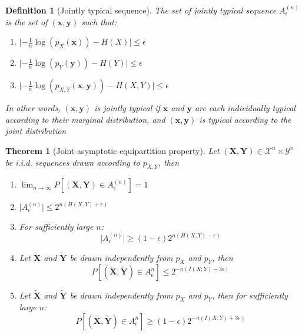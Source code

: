 \documentclass{article}
\newcommand{\norm}[1]{\vert {#1} \vert}
\newtheorem{definition}{Definition}[section]
\newtheorem{theorem}{Theorem}[section]
\begin{document}
    \begin{definition}[Jointly typical sequence]
        The set of jointly typical sequence $A_\epsilon^{(n)}$ is the set of $(\mathbf{x}, \mathbf{y})$ such that:

        \begin{enumerate}
            \item $\norm{-\frac{1}{n}\log(p_X(\mathbf{x})) - H(X)} \leq \epsilon$
            \item $\norm{-\frac{1}{n}\log(p_Y(\mathbf{y})) - H(Y)} \leq \epsilon$
            \item $\norm{
                -\frac{1}{n}\log(p_{X, Y}(\mathbf{x}, \mathbf{y})) - H(X, Y)
            } \leq \epsilon$
        \end{enumerate}

        In other words, $(\mathbf{x}, \mathbf{y})$ is jointly typical if $\mathbf{x}$ and $\mathbf{y}$ are each individually typical according to their marginal distribution, and $(\mathbf{x}, \mathbf{y})$ is typical according to the joint distribution
    \end{definition}

    \begin{theorem}[Joint asymptotic equipartition property]
        Let $(\mathbf{X}, \mathbf{Y}) \in \mathcal{X}^n \times \mathcal{Y}^n$ be i.i.d. sequences drawn according to $p_{X, Y}$, then

        \begin{enumerate}
            \item $
                \lim_{n \rightarrow \infty}
                P[(\mathbf{X}, \mathbf{Y}) \in A_\epsilon^{(n)}] = 1
            $
            \item $\norm{A_\epsilon^{(n)}} \leq 2^{
                n(H(X, Y) + \epsilon)
            }$
            \item For sufficiently large $n$:
                $$
                \norm{A_\epsilon^{(n)}} \geq (1-\epsilon)2^{n(H(X, Y) - \epsilon)}
                $$
            \item Let $\tilde{\mathbf{X}}$ and $\tilde{\mathbf{Y}}$ be drawn independently from $p_X$ and $p_Y$, then
                $$
                    P[(\tilde{\mathbf{X}}, \tilde{\mathbf{Y}}) \in A_\epsilon^n] 
                    \leq 2^{-n(I(X; Y) - 3\epsilon)}
                $$
            \item Let $\tilde{\mathbf{X}}$ and $\tilde{\mathbf{Y}}$ be drawn independently from $p_X$ and $p_Y$, then for sufficiently large $n$:
                $$
                    P[(\tilde{\mathbf{X}}, \tilde{\mathbf{Y}}) \in A_\epsilon^n] 
                    \geq (1-\epsilon)2^{-n(I(X; Y) + 3\epsilon)}
                $$
        \end{enumerate}
    \end{theorem}
\end{document}
